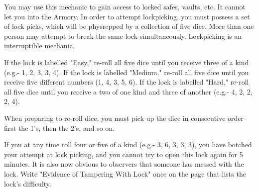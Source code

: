 \documentclass[green]{guildcamp3}
\begin{document}
	
	\name{\gLockpicking{}}
	

	
	You may use this mechanic to gain access to locked safes, vaults, etc. It cannot let you into the Armory.
	In order to attempt lockpicking, you must possess a set of lock picks, which will be physrepped by a collection of five dice. More than one person may attempt to break the same lock simultaneously. Lockpicking is an interruptible mechanic.
	
	
	\begin{enum}[Directions]
		\item If the lock is labelled "Easy," re-roll all five dice until you receive three of a kind (e.g.- 1, 2, 3, 3, 4). If the lock is labelled "Medium," re-roll all five dice until you receive five different numbers (1, 4, 3, 5, 6). If the lock is labelled "Hard," re-roll all five dice until you receive a two of one kind and three of another (e.g.- 4, 2, 2, 2, 4).
		\item When preparing to re-roll dice, you must pick up the dice in consecutive order-- first the 1's, then the 2's, and so on.
		\item If you at any time roll four or five of a kind (e.g.- 3, 6, 3, 3, 3), you have botched your attempt at lock picking, and you cannot try to open this lock again for 5 minutes. It is also now obvious to observers that someone has messed with the lock. Write "Evidence of Tampering With Lock" once on the page that lists the lock's difficulty.
		\end{enum}
	
	
\end{document}
